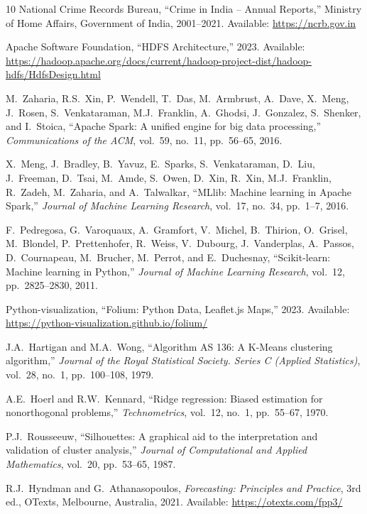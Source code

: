 \documentclass[a4paper,12pt]{article}
\begin{document}
\begin{thebibliography}{10}
 National Crime Records Bureau, ``Crime in India -- Annual Reports,'' Ministry of Home Affairs, Government of India, 2001--2021. Available: \url{https://ncrb.gov.in}

 Apache Software Foundation, ``HDFS Architecture,'' 2023. Available: \url{https://hadoop.apache.org/docs/current/hadoop-project-dist/hadoop-hdfs/HdfsDesign.html}

 M.\ Zaharia, R.S.\ Xin, P.\ Wendell, T.\ Das, M.\ Armbrust, A.\ Dave, X.\ Meng, J.\ Rosen, S.\ Venkataraman, M.J.\ Franklin, A.\ Ghodsi, J.\ Gonzalez, S.\ Shenker, and I.\ Stoica, ``Apache Spark: A unified engine for big data processing,'' \textit{Communications of the ACM}, vol.\ 59, no.\ 11, pp.\ 56--65, 2016.

 X.\ Meng, J.\ Bradley, B.\ Yavuz, E.\ Sparks, S.\ Venkataraman, D.\ Liu, J.\ Freeman, D.\ Tsai, M.\ Amde, S.\ Owen, D.\ Xin, R.\ Xin, M.J.\ Franklin, R.\ Zadeh, M.\ Zaharia, and A.\ Talwalkar, ``MLlib: Machine learning in Apache Spark,'' \textit{Journal of Machine Learning Research}, vol.\ 17, no.\ 34, pp.\ 1--7, 2016.

 F.\ Pedregosa, G.\ Varoquaux, A.\ Gramfort, V.\ Michel, B.\ Thirion, O.\ Grisel, M.\ Blondel, P.\ Prettenhofer, R.\ Weiss, V.\ Dubourg, J.\ Vanderplas, A.\ Passos, D.\ Cournapeau, M.\ Brucher, M.\ Perrot, and E.\ Duchesnay, ``Scikit-learn: Machine learning in Python,'' \textit{Journal of Machine Learning Research}, vol.\ 12, pp.\ 2825--2830, 2011.

 Python-visualization, ``Folium: Python Data, Leaflet.js Maps,'' 2023. Available: \url{https://python-visualization.github.io/folium/}

 J.A.\ Hartigan and M.A.\ Wong, ``Algorithm AS 136: A K-Means clustering algorithm,'' \textit{Journal of the Royal Statistical Society. Series C (Applied Statistics)}, vol.\ 28, no.\ 1, pp.\ 100--108, 1979.

 A.E.\ Hoerl and R.W.\ Kennard, ``Ridge regression: Biased estimation for nonorthogonal problems,'' \textit{Technometrics}, vol.\ 12, no.\ 1, pp.\ 55--67, 1970.

 P.J.\ Rousseeuw, ``Silhouettes: A graphical aid to the interpretation and validation of cluster analysis,'' \textit{Journal of Computational and Applied Mathematics}, vol.\ 20, pp.\ 53--65, 1987.

 R.J.\ Hyndman and G.\ Athanasopoulos, \textit{Forecasting: Principles and Practice}, 3rd ed., OTexts, Melbourne, Australia, 2021. Available: \url{https://otexts.com/fpp3/}
\end{thebibliography}
\end{document}
